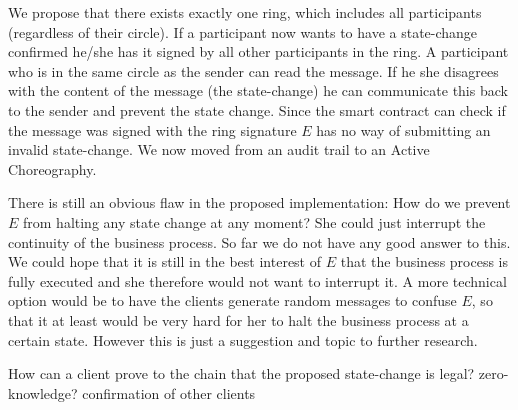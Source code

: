 \documentclass[runningheads]{llncs}
\begin{document}
We propose that there exists exactly one ring, which includes all participants (regardless of their circle). If a participant now wants to have a state-change confirmed he/she has it signed by all other participants in the ring. A participant who is in the same circle as the sender can read the message. If he she disagrees with the content of the message (the state-change) he can communicate this back to the sender and prevent the state change. Since the smart contract can check if the message was signed with the ring signature $E$ has no way of submitting an invalid state-change. We now moved from an audit trail to an Active Choreography. 

There is still an obvious flaw in the proposed implementation: How do we prevent $E$ from halting any state change at any moment? She could just interrupt the continuity of the business process. So far we do not have any good answer to this. We could hope that it is still in the best interest of $E$ that the business process is fully executed and she therefore would not want to interrupt it. A more technical option would be to have the clients generate random messages to confuse $E$, so that it at least would be very hard for her to halt the business process at a certain state. However this is just a suggestion and topic to further research.


How can a client prove to the chain that the proposed state-change is legal?
zero-knowledge?
confirmation of other clients
\end{document}
